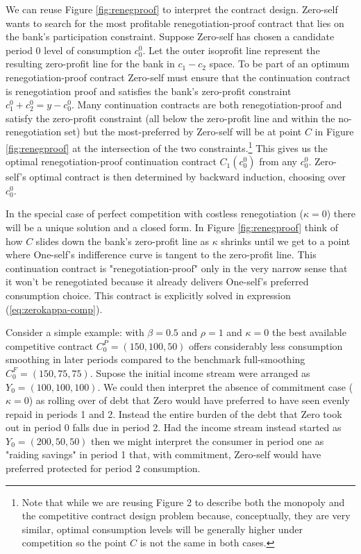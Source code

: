 \documentclass[11pt,english]{article}
\theoremstyle{plain}
\theoremstyle{definition}
\begin{document}
We can reuse Figure \ref{fig:renegproof} to interpret the contract
design. Zero-self wants to search for the most profitable renegotiation-proof
contract that lies on the bank's participation constraint. Suppose Zero-self has chosen a candidate period 0 level
of consumption $c_{0}^{0}$. Let the outer isoprofit line represent the resulting zero-profit line for the bank in  $c_{1}-c_{2}$ space. To be part of an optimum renegotiation-proof
contract Zero-self must ensure that the continuation contract is renegotiation
proof and satisfies the bank's zero-profit constraint $c_{1}^{0}+c_{2}^{0}=y-c_{0}^{0}$.
Many continuation contracts are both renegotiation-proof and satisfy
the zero-profit constraint (all below the zero-profit line and
within the no-renegotiation set) but the most-preferred by Zero-self
will be at point $C$ in Figure \ref{fig:renegproof} at the intersection
of the two constraints.\footnote{Note that while we are reusing Figure 2 to describe both the monopoly
and the competitive contract design problem because, conceptually,
they are very similar, optimal consumption levels will be generally
higher under competition so the point $C$ is not the same in both
cases.} This gives us the optimal renegotiation-proof continuation contract
$C_{1}^ {}(c_{0}^{0})$ from any $c_{0}^{0}$. Zero-self's optimal
contract is then determined by backward induction, choosing over $c_{0}^{0}$.

In the special case of perfect competition with costless renegotiation
($\kappa=0$) there will be a unique solution and a closed form. In
Figure \ref{fig:renegproof} think of how $C$ slides down the bank's
zero-profit line as $\kappa$ shrinks until we get to a point where
One-self's indifference curve is tangent to the zero-profit line.
This continuation contract is "renegotiation-proof" only in the very
narrow sense that it won't be renegotiated because it already delivers
One-self's preferred consumption choice. This contract is explicitly
solved in expression (\ref{eq:zerokappa-comp}).

Consider a simple example: with $\beta=0.5$
and $\rho=1$ and $\kappa=0$ the best available competitive contract
$C_{0}^{P}=(150,100,50)$ offers considerably less consumption smoothing
in later periods compared to the benchmark full-smoothing $C_{0}^{F}=(150,75,75)$.
Supose the initial income stream were arranged as $Y_{0}=(100,100,100).$
We  could then interpret the absence of commitment case ($\kappa=0$) as
rolling over of debt that Zero would have preferred to have
seen evenly repaid in periods 1 and 2. Instead the entire burden of the debt that Zero took out in period
0 falls due in period 2. Had the income stream
instead started as $Y_{0}=(200,50,50)$ then we might interpret the consumer
in period one as "raiding savings" in period 1 that, with commitment, Zero-self
would have preferred protected for period 2 consumption.
\end{document}
